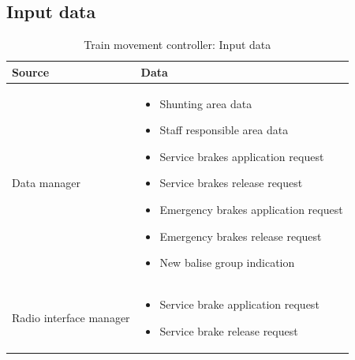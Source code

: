 \documentclass[nocc]{template/openetcs_report}
\begin{document}
\subsection{Input data}
			\begin{longtable}{|l|l|}
				\caption{Train movement controller: Input data}\\ 
				\hline
				
					\begin{minipage}[t]{0.35\linewidth} \textbf{Source}	\end{minipage} 
				&	\begin{minipage}[t]{0.65\linewidth} \textbf{Data} \end{minipage} \\
				
				\hline
																																									
					\begin{minipage}[t]{0.35\linewidth} Data manager	\end{minipage} 
				&	\begin{minipage}[t]{0.65\linewidth}
						\begin{itemize}
							\item Shunting area data
							\item Staff responsible area data
							\item Service brakes application request
							\item Service brakes release request
							\item Emergency brakes application request
							\item Emergency brakes release request
							\item New balise group indication
						\end{itemize}
					\end{minipage} \\
				
				\hline
				
					\begin{minipage}[t]{0.35\linewidth} Radio interface manager	\end{minipage} 
				&	\begin{minipage}[t]{0.65\linewidth}
						\begin{itemize}
							\item Service brake application request
							\item Service brake release request
						\end{itemize}			
					\end{minipage} \\
				

\end{longtable}
\end{document}

